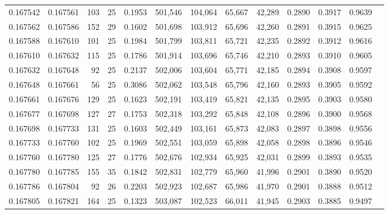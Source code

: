 \begin{tabular}{rrrrrrrrrrrrr}
0.167542 & 0.167561 & 103 &  25 &                                     0.1953 & 501,546 & 104,064 &  65,667 &  42,289 & 0.2890 & 0.3917 & 0.9639 \\
0.167562 & 0.167586 & 152 &  29 &                                     0.1602 & 501,698 & 103,912 &  65,696 &  42,260 & 0.2891 & 0.3915 & 0.9625 \\
0.167588 & 0.167610 & 101 &  25 &                                     0.1984 & 501,799 & 103,811 &  65,721 &  42,235 & 0.2892 & 0.3912 & 0.9616 \\
0.167610 & 0.167632 & 115 &  25 &                                     0.1786 & 501,914 & 103,696 &  65,746 &  42,210 & 0.2893 & 0.3910 & 0.9605 \\
0.167632 & 0.167648 &  92 &  25 &                                     0.2137 & 502,006 & 103,604 &  65,771 &  42,185 & 0.2894 & 0.3908 & 0.9597 \\
0.167648 & 0.167661 &  56 &  25 &                                     0.3086 & 502,062 & 103,548 &  65,796 &  42,160 & 0.2893 & 0.3905 & 0.9592 \\
0.167661 & 0.167676 & 129 &  25 &                                     0.1623 & 502,191 & 103,419 &  65,821 &  42,135 & 0.2895 & 0.3903 & 0.9580 \\
0.167677 & 0.167698 & 127 &  27 &                                     0.1753 & 502,318 & 103,292 &  65,848 &  42,108 & 0.2896 & 0.3900 & 0.9568 \\
0.167698 & 0.167733 & 131 &  25 &                                     0.1603 & 502,449 & 103,161 &  65,873 &  42,083 & 0.2897 & 0.3898 & 0.9556 \\
0.167733 & 0.167760 & 102 &  25 &                                     0.1969 & 502,551 & 103,059 &  65,898 &  42,058 & 0.2898 & 0.3896 & 0.9546 \\
0.167760 & 0.167780 & 125 &  27 &                                     0.1776 & 502,676 & 102,934 &  65,925 &  42,031 & 0.2899 & 0.3893 & 0.9535 \\
0.167780 & 0.167785 & 155 &  35 &                                     0.1842 & 502,831 & 102,779 &  65,960 &  41,996 & 0.2901 & 0.3890 & 0.9520 \\
0.167786 & 0.167804 &  92 &  26 &                                     0.2203 & 502,923 & 102,687 &  65,986 &  41,970 & 0.2901 & 0.3888 & 0.9512 \\
0.167805 & 0.167821 & 164 &  25 &                                     0.1323 & 503,087 & 102,523 &  66,011 &  41,945 & 0.2903 & 0.3885 & 0.9497 \\

\end{tabular}
